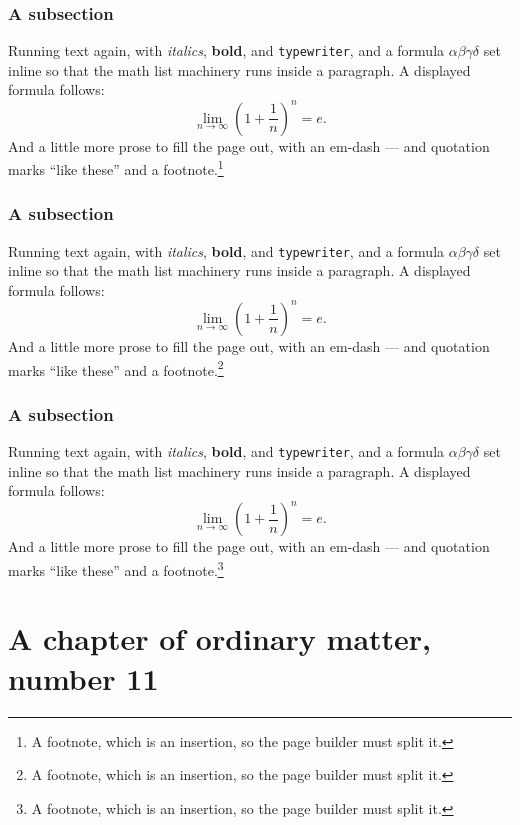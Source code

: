 \documentclass[11pt,a4paper]{report}
\theoremstyle{plain}
\begin{document}
\subsection{A subsection}
Running text again, with \textit{italics}, \textbf{bold}, and
\texttt{typewriter}, and a formula $\alpha\beta\gamma\delta$ set inline so
that the math list machinery runs inside a paragraph. A displayed formula
follows:
\[ \lim_{n\to\infty}\left(1+\frac{1}{n}\right)^{n}=e . \]
And a little more prose to fill the page out, with an em-dash --- and
quotation marks ``like these'' and a footnote.\footnote{A footnote, which is
an insertion, so the page builder must split it.}
\subsection{A subsection}
Running text again, with \textit{italics}, \textbf{bold}, and
\texttt{typewriter}, and a formula $\alpha\beta\gamma\delta$ set inline so
that the math list machinery runs inside a paragraph. A displayed formula
follows:
\[ \lim_{n\to\infty}\left(1+\frac{1}{n}\right)^{n}=e . \]
And a little more prose to fill the page out, with an em-dash --- and
quotation marks ``like these'' and a footnote.\footnote{A footnote, which is
an insertion, so the page builder must split it.}
\subsection{A subsection}
Running text again, with \textit{italics}, \textbf{bold}, and
\texttt{typewriter}, and a formula $\alpha\beta\gamma\delta$ set inline so
that the math list machinery runs inside a paragraph. A displayed formula
follows:
\[ \lim_{n\to\infty}\left(1+\frac{1}{n}\right)^{n}=e . \]
And a little more prose to fill the page out, with an em-dash --- and
quotation marks ``like these'' and a footnote.\footnote{A footnote, which is
an insertion, so the page builder must split it.}
\chapter{A chapter of ordinary matter, number 11}
\end{document}
